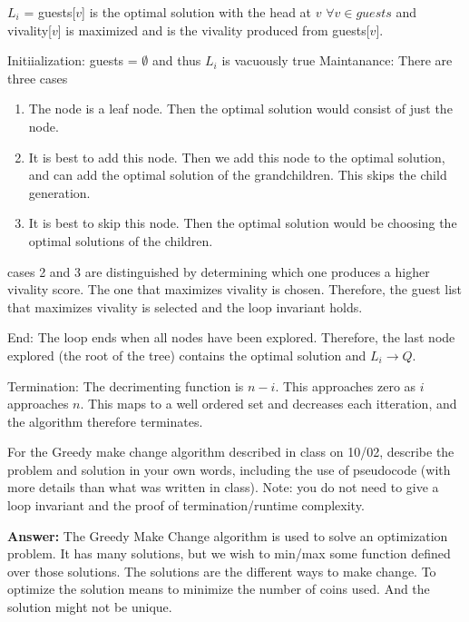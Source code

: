 \documentclass{article}
\begin{document}
 $L_i$ = guests[$v$] is the optimal solution with the head at $v$ $\forall v \in guests$ and vivality[$v$] is maximized and is the vivality produced from guests[$v$].
 
 Initiialization: guests = $\emptyset$ and thus $L_i$ is vacuously true
 Maintanance: There are three cases
 \begin{enumerate}[1.]
 \item The node is a leaf node. Then the optimal solution would consist of just the node.
 \item It is best to add this node. Then we add this node to the optimal solution, and can add the optimal solution of the grandchildren. This skips the child generation.
 \item It is best to skip this node. Then the optimal solution would be choosing the optimal solutions of the children.
 \end{enumerate}
 cases 2 and 3 are distinguished by determining which one produces a higher vivality score. The one that maximizes vivality is chosen. Therefore, the guest list that maximizes vivality is selected and the loop invariant holds.
 
 End: The loop ends when all nodes have been explored. Therefore, the last node explored (the root of the tree) contains the optimal solution and $L_i \rightarrow Q$.
 
 Termination: The decrimenting function is $n - i$. This approaches zero as $i$
 approaches $n$. This maps to a well ordered set and decreases each itteration, and the algorithm therefore terminates.


\nextprob
For the Greedy make change algorithm described in class on 10/02, describe the
problem and solution in your own words, including the use of pseudocode (with
more details than what was written in class).  Note: you do not need to give a
loop invariant and the proof of termination/runtime complexity.

\textbf{Answer:} The Greedy Make Change algorithm is used to solve an optimization problem. It has many solutions, but we wish to min/max some function defined over those solutions. The solutions are the different ways to make change. To optimize the solution means to minimize the number of coins used. And the solution might not be unique.
\end{document}
